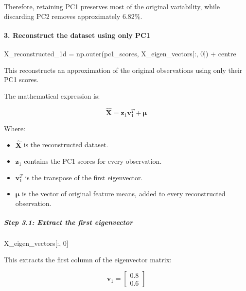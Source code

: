 \documentclass[11pt]{article}
\providecommand{\tightlist}{%
      \setlength{\itemsep}{0pt}\setlength{\parskip}{0pt}}
\newenvironment{Shaded}{}{}
\newcommand{\DecValTok}[1]{\textcolor[rgb]{0.25,0.63,0.44}{{#1}}}
\newcommand{\NormalTok}[1]{{#1}}
\newcommand{\OperatorTok}[1]{\textcolor[rgb]{0.40,0.40,0.40}{{#1}}}
\begin{document}
Therefore, retaining PC1 preserves most of the original variability,
while discarding PC2 removes approximately 6.82\%.

\paragraph{3. Reconstruct the dataset using only
PC1}\label{reconstruct-the-dataset-using-only-pc1}

\begin{Shaded}
\begin{Highlighting}[]
\NormalTok{X\_reconstructed\_1d }\OperatorTok{=}\NormalTok{ np.outer(pc1\_scores, X\_eigen\_vectors[:, }\DecValTok{0}\NormalTok{]) }\OperatorTok{+}\NormalTok{ centre}
\end{Highlighting}
\end{Shaded}

This reconstructs an approximation of the original observations using
only their PC1 scores.

The mathematical expression is:

\[
\boxed{
\hat{\mathbf X}
=
\mathbf z_1\mathbf v_1^T+\boldsymbol\mu
}
\]

Where:

\begin{itemize}
\tightlist
\item
  \(\hat{\mathbf X}\) is the reconstructed dataset.
\item
  \(\mathbf z_1\) contains the PC1 scores for every observation.
\item
  \(\mathbf v_1^T\) is the transpose of the first eigenvector.
\item
  \(\boldsymbol\mu\) is the vector of original feature means, added to
  every reconstructed observation.
\end{itemize}

\subparagraph{Step 3.1: Extract the first
eigenvector}\label{step-3.1-extract-the-first-eigenvector}

\begin{Shaded}
\begin{Highlighting}[]
\NormalTok{X\_eigen\_vectors[:, }\DecValTok{0}\NormalTok{]}
\end{Highlighting}
\end{Shaded}

This extracts the first column of the eigenvector matrix:

\[
\mathbf v_1=
\begin{bmatrix}
0.8\\
0.6
\end{bmatrix}
\]
\end{document}
